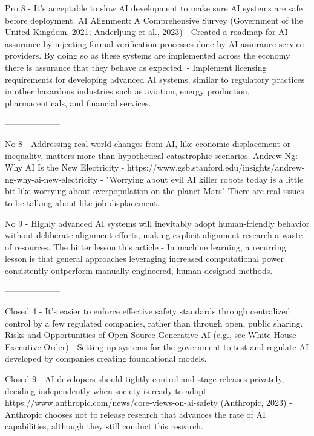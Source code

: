 Pro 8 - It's acceptable to slow AI development to make sure AI systems are safe before deployment.
AI Alignment: A Comprehensive Survey
(Government of the United Kingdom, 2021; Anderljung et al., 2023)
\citep{government_of_the_united_kingdom_roadmap_2021} - Created a roadmap for AI assurance by injecting formal verification processes done by AI assurance service providers. By doing so as these systems are implemented across the economy there is assurance that they behave as expected.
\citep{anderljung_frontier_2023} - Implement licensing requirements for developing advanced AI systems, similar to regulatory practices in other hazardous industries such as aviation, energy production, pharmaceuticals, and financial services.

--------------------

No 8 - Addressing real-world changes from AI, like economic displacement or inequality, matters more than hypothetical catastrophic scenarios.
Andrew Ng: Why AI Is the New Electricity - https://www.gsb.stanford.edu/insights/andrew-ng-why-ai-new-electricity
\citep{ng_andrew_2017} - "Worrying about evil AI killer robots today is a little bit like worrying about overpopulation on the planet Mars" There are real issues to be talking about like job displacement.

No 9 - Highly advanced AI systems will inevitably adopt human-friendly behavior without deliberate alignment efforts, making explicit alignment research a waste of resources.
The bitter lesson
this article
\citep{sutton_bitter_2019} - In machine learning, a recurring lesson is that general approaches leveraging increased computational power consistently outperform manually engineered, human-designed methods.

--------------------

Closed 4 - It's easier to enforce effective safety standards through centralized control by a few regulated companies, rather than through open, public sharing.
Risks and Opportunities of Open-Source Generative AI
(e.g., see White House Executive Order)
\citep{the_white_house_fact_2023} - Setting up systems for the government to test and regulate AI developed by companies creating foundational models.

Closed 9 - AI developers should tightly control and stage releases privately, deciding independently when society is ready to adapt.
https://www.anthropic.com/news/core-views-on-ai-safety
(Anthropic, 2023)
\citep{anthropic_core_2023} - Anthropic chooses not to release research that advances the rate of AI capabilities, although they still conduct this research.

